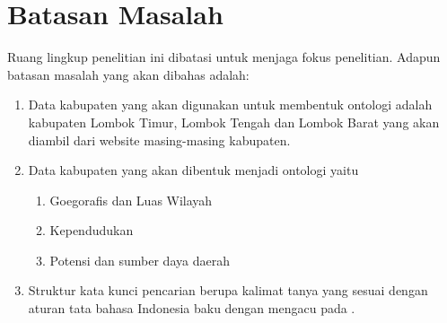 \section{Batasan Masalah}
Ruang lingkup penelitian ini dibatasi untuk menjaga fokus penelitian. Adapun batasan masalah yang akan dibahas adalah:
\begin{enumerate}
	\item Data kabupaten yang akan digunakan untuk membentuk ontologi adalah kabupaten Lombok Timur, Lombok Tengah dan Lombok Barat yang akan diambil dari website masing-masing kabupaten.
	\item Data kabupaten yang akan dibentuk menjadi ontologi yaitu
	\begin{enumerate}
		\item Goegorafis dan Luas Wilayah
		\item Kependudukan 
		\item Potensi dan sumber daya daerah
	\end{enumerate}
	\item Struktur kata kunci pencarian berupa kalimat tanya yang sesuai dengan aturan tata bahasa Indonesia baku dengan mengacu pada \citet{alwi}.
\end{enumerate}